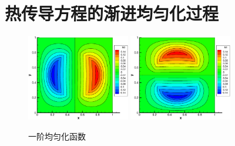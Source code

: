 

\section{热传导方程的渐进均匀化过程}
\begin{figure}[htbp]
	\begin{center}
		\includegraphics[width=0.4\textwidth]{pics/n0.eps}
		\includegraphics[width=0.4\textwidth]{pics/n1.eps}
	\end{center}
	\caption{一阶均匀化函数}
	\label{fig:homo1}
\end{figure}
\newpage
